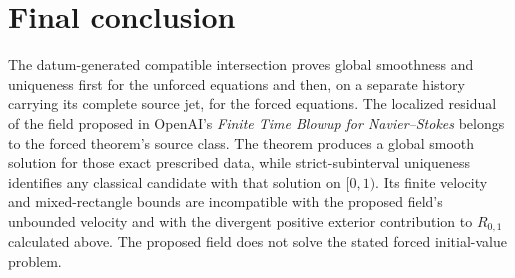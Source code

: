

\clearpage
\section*{Final conclusion}

The datum-generated compatible intersection proves global smoothness and
uniqueness first for the unforced equations and then, on a separate history
carrying its complete source jet, for the forced equations.  The localized
residual of the field proposed in OpenAI's \emph{Finite Time Blowup for
Navier--Stokes} belongs to the forced theorem's source class.  The theorem
produces a global smooth solution for those exact prescribed data, while
strict-subinterval uniqueness identifies any classical candidate with that
solution on \([0,1)\).  Its finite velocity and mixed-rectangle bounds are
incompatible with the proposed field's unbounded velocity and with the
divergent positive exterior contribution to \(R_{0,1}\) calculated above.  The
proposed field does not
solve the stated forced initial-value problem.
